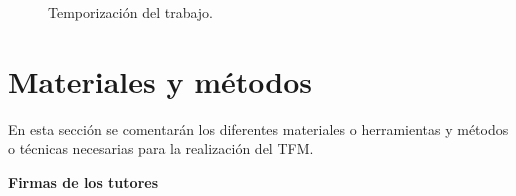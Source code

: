 \documentclass[titlepage, 12pt, a4paper, oneside]{article}
\begin{document}
\begin{figure}
  \begin{center}
  \end{center}
  \caption{Temporización del trabajo.\label{fig:temporizacion}}
\end{figure}

\section{Materiales y métodos}
En esta sección se comentarán los diferentes materiales o herramientas y métodos o técnicas necesarias para la realización del TFM.




\vspace{5ex}

\begin{center}
  \textbf{Firmas de los tutores}
\end{center}
\end{document}
